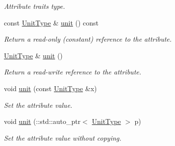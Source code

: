 \begin{DoxyCompactItemize}
\begin{DoxyCompactList}\small\item\em Attribute traits type. \item\end{DoxyCompactList}\item 
const \hyperlink{classopenstack_1_1xml_1_1RateLimitUnit}{UnitType} \& \hyperlink{classopenstack_1_1xml_1_1RateLimit_a0e8c51ef646f47ee87d1776d236eed53}{unit} () const 
\begin{DoxyCompactList}\small\item\em Return a read-\/only (constant) reference to the attribute. \item\end{DoxyCompactList}\item 
\hyperlink{classopenstack_1_1xml_1_1RateLimitUnit}{UnitType} \& \hyperlink{classopenstack_1_1xml_1_1RateLimit_a014d80fb0de66c49697373329be0edd6}{unit} ()
\begin{DoxyCompactList}\small\item\em Return a read-\/write reference to the attribute. \item\end{DoxyCompactList}\item 
void \hyperlink{classopenstack_1_1xml_1_1RateLimit_a49de1642eef66f7728771c90548be3cc}{unit} (const \hyperlink{classopenstack_1_1xml_1_1RateLimitUnit}{UnitType} \&x)
\begin{DoxyCompactList}\small\item\em Set the attribute value. \item\end{DoxyCompactList}\item 
void \hyperlink{classopenstack_1_1xml_1_1RateLimit_aff4feac43de60d5f11979ba725e6b215}{unit} (::std::auto\_\-ptr$<$ \hyperlink{classopenstack_1_1xml_1_1RateLimitUnit}{UnitType} $>$ p)
\begin{DoxyCompactList}\small\item\em Set the attribute value without copying. \item\end{DoxyCompactList}\end{DoxyCompactItemize}
